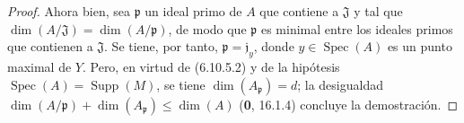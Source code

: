 \begin{proof}
Ahora bien, sea $\mathfrak p$ un ideal primo de $A$ que contiene a $\mathfrak J$ y
tal que $\dim(A/\mathfrak J)=\dim(A/\mathfrak p)$, de modo que
$\mathfrak p$ es minimal entre los ideales primos que contienen a
$\mathfrak J$. Se tiene, por tanto, $\mathfrak p=\mathfrak j_y$, donde
$y\in\operatorname{Spec}(A)$ es un punto maximal de $Y$. Pero, en virtud de
(6.10.5.2) y de la hipótesis
$\operatorname{Spec}(A)=\operatorname{Supp}(M)$, se tiene
$\dim(A_{\mathfrak p})=d$; la desigualdad
$\dim(A/\mathfrak p)+\dim(A_{\mathfrak p})\leq\dim(A)$ (\textbf 0, 16.1.4)
concluye la demostración.
\end{proof}
